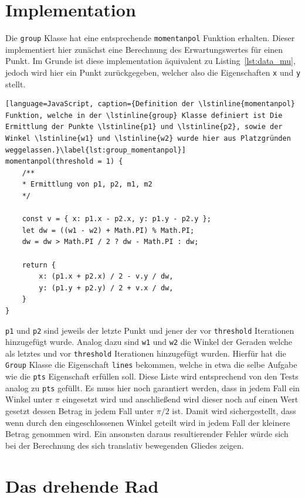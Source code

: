 \section{Implementation}

Die \lstinline{group} Klasse hat eine entsprechende \lstinline{momentanpol} Funktion erhalten.
Dieser implementiert hier zunächst eine Berechnung des Erwartungswertes für einen Punkt.
Im Grunde ist diese implementation äquivalent zu Listing~\ref{lst:data_mu}, jedoch wird hier ein Punkt zurückgegeben, welcher also die Eigenschaften \lstinline{x} und \lstinline{y} stellt.

\begin{lstlisting}[language=JavaScript, caption={Definition der \lstinline{momentanpol} Funktion, welche in der \lstinline{group} Klasse definiert ist Die Ermittlung der Punkte \lstinline{p1} und \lstinline{p2}, sowie der Winkel \lstinline{w1} und \lstinline{w2} wurde hier aus Platzgründen weggelassen.}\label{lst:group_momentanpol}]
momentanpol(threshold = 1) {
    /**
    * Ermittlung von p1, p2, m1, m2
    */

    const v = { x: p1.x - p2.x, y: p1.y - p2.y };
    let dw = ((w1 - w2) + Math.PI) % Math.PI;
    dw = dw > Math.PI / 2 ? dw - Math.PI : dw;

    return {
        x: (p1.x + p2.x) / 2 - v.y / dw,
        y: (p1.y + p2.y) / 2 + v.x / dw,
    }
}
\end{lstlisting}

\lstinline{p1} und \lstinline{p2} sind jeweils der letzte Punkt und jener der vor \lstinline{threshold} Iterationen hinzugefügt wurde.
Analog dazu sind \lstinline{w1} und \lstinline{w2} die Winkel der Geraden welche als letztes und vor \lstinline{threshold} Iterationen hinzugefügt wurden.
Hierfür hat die \lstinline{Group} Klasse die Eigenschaft \lstinline{lines} bekommen, welche in etwa die selbe Aufgabe wie die \lstinline{pts} Eigenschaft erfüllen soll.
Diese Liste wird entsprechend von den Tests analog zu \lstinline{pts} gefüllt.
Es muss hier noch garantiert werden, dass in jedem Fall ein Winkel unter $\pi$ eingesetzt wird und anschließend wird dieser noch auf einen Wert gesetzt dessen Betrag in jedem Fall unter $\pi / 2$ ist. Damit wird sichergestellt, dass wenn durch den eingeschlossenen Winkel geteilt wird in jedem Fall der kleinere Betrag genommen wird.
Ein ansonsten daraus resultierender Fehler würde sich bei der Berechnung des sich translativ bewegenden Gliedes zeigen.

\section{Das drehende Rad}\label{ch:drehendesRad}

